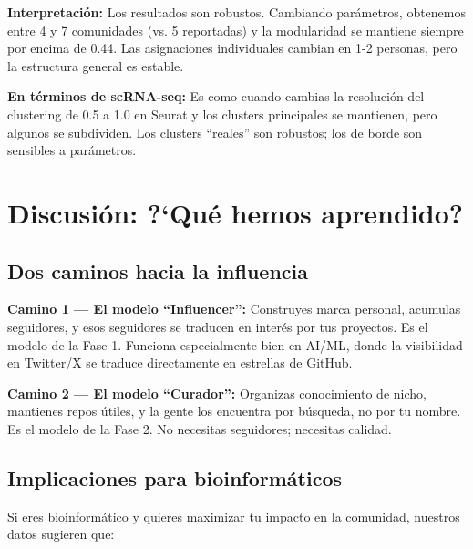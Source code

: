 \documentclass[11pt]{article}
\begin{document}
\textbf{Interpretaci\'{o}n:} Los resultados son robustos. Cambiando par\'{a}metros, obtenemos entre 4 y 7 comunidades (vs. 5 reportadas) y la modularidad se mantiene siempre por encima de 0.44. Las asignaciones individuales cambian en 1-2 personas, pero la estructura general es estable.

\textcolor{tommyblue}{\textbf{En t\'{e}rminos de scRNA-seq:}} Es como cuando cambias la resoluci\'{o}n del clustering de 0.5 a 1.0 en Seurat y los clusters principales se mantienen, pero algunos se subdividen. Los clusters ``reales'' son robustos; los de borde son sensibles a par\'{a}metros.


\section{Discusi\'{o}n: ?`Qu\'{e} hemos aprendido?}

\subsection{Dos caminos hacia la influencia}

\textbf{Camino 1 --- El modelo ``Influencer'':} Construyes marca personal, acumulas seguidores, y esos seguidores se traducen en inter\'{e}s por tus proyectos. Es el modelo de la Fase 1. Funciona especialmente bien en AI/ML, donde la visibilidad en Twitter/X se traduce directamente en estrellas de GitHub.

\textbf{Camino 2 --- El modelo ``Curador'':} Organizas conocimiento de nicho, mantienes repos \'{u}tiles, y la gente los encuentra por b\'{u}squeda, no por tu nombre. Es el modelo de la Fase 2. No necesitas seguidores; necesitas calidad.

\subsection{Implicaciones para bioinform\'{a}ticos}

Si eres bioinform\'{a}tico y quieres maximizar tu impacto en la comunidad, nuestros datos sugieren que:
\end{document}
